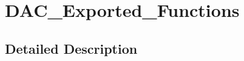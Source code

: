 \hypertarget{group___d_a_c___exported___functions}{\section{D\-A\-C\-\_\-\-Exported\-\_\-\-Functions}
\label{group___d_a_c___exported___functions}
}


\subsection{Detailed Description}
